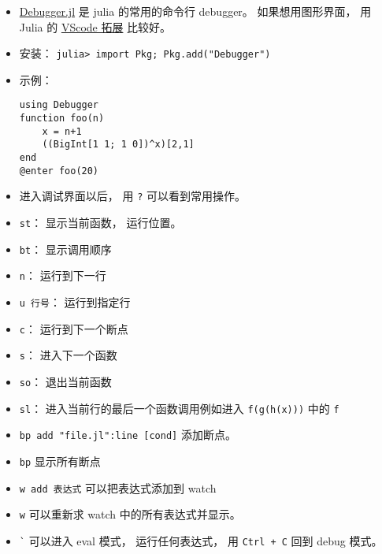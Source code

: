 
\begin{issues}
\issueDraft
\end{issues}

\begin{itemize}
\item \href{https://github.com/JuliaDebug/Debugger.jl}{Debugger.jl} 是 julia 的常用的命令行 debugger。 如果想用图形界面， 用 Julia 的 \href{https://www.julia-vscode.org}{VScode 拓展} 比较好。
\item 安装： \verb|julia> import Pkg; Pkg.add("Debugger")|
\item 示例：
\begin{lstlisting}[language=none]
using Debugger
function foo(n)
    x = n+1
    ((BigInt[1 1; 1 0])^x)[2,1]
end
@enter foo(20)
\end{lstlisting}
\item 进入调试界面以后， 用 \verb|?| 可以看到常用操作。
\item \verb|st|： 显示当前函数， 运行位置。
\item \verb|bt|： 显示调用顺序
\item \verb|n|： 运行到下一行
\item \verb|u 行号|： 运行到指定行
\item \verb|c|： 运行到下一个断点
\item \verb|s|： 进入下一个函数
\item \verb|so|： 退出当前函数
\item \verb|sl|： 进入当前行的最后一个函数调用例如进入 \verb|f(g(h(x)))| 中的 \verb|f|
\item \verb|bp add "file.jl":line [cond]| 添加断点。
\item \verb|bp| 显示所有断点
\item \verb|w add 表达式| 可以把表达式添加到 watch
\item \verb|w| 可以重新求 watch 中的所有表达式并显示。
\item \verb|`| 可以进入 eval 模式， 运行任何表达式， 用 \verb|Ctrl + C| 回到 debug 模式。
\end{itemize}
